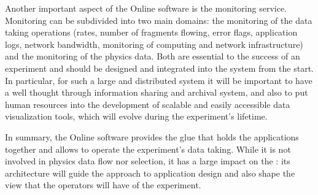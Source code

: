 Another important aspect of the Online software is the monitoring
service.
Monitoring can be subdivided into two main domains: the monitoring of
the data taking operations (rates, number of fragments flowing, error
flags, application logs, network bandwidth, monitoring of computing
and network infrastructure) and the monitoring of the physics data.
Both are essential to the success of an experiment and should be
designed and integrated into the  system from the start.
In particular, for such a large and distributed system it will be
important to have a well thought through information sharing and
archival system, and also to put human resources into the development
of scalable and easily accessible data visualization tools, which will
evolve during the experiment’s lifetime.

In summary, the Online software provides the glue that holds the
 applications together and allows to operate the
experiment’s data taking.
While it is not involved in physics data flow nor selection, it has a
large impact on the : its architecture will guide the
approach to  application design and also shape the view
that the operators will have of the experiment.

